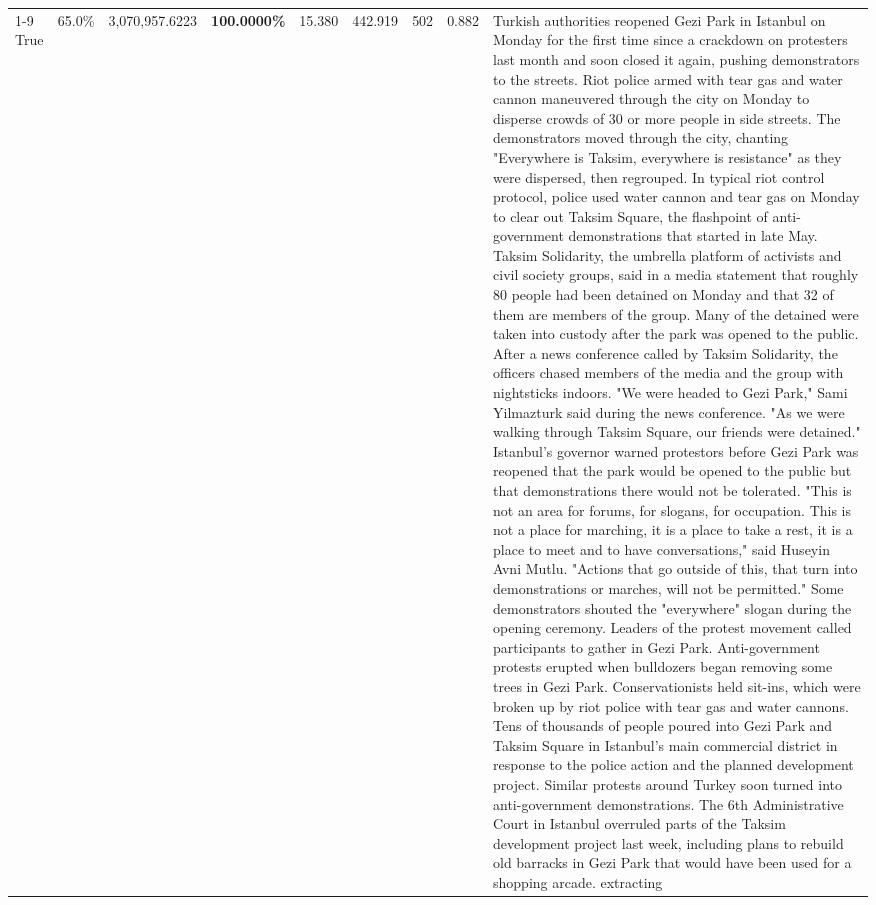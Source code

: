 \begin{table}[H]
\begin{tabular}{lllrlllll}
\cline{1-9}
True & 65.0\% & 3,070,957.6223 & \bfseries \color{red} 100.0000\% & 15.380 & 442.919 & 502 & 0.882 & Turkish authorities reopened Gezi Park in Istanbul on Monday for the first time since a crackdown on protesters last month and soon closed it again, pushing demonstrators to the streets. Riot police armed with tear gas and water cannon maneuvered through the city on Monday to disperse crowds of 30 or more people in side streets. The demonstrators moved through the city, chanting "Everywhere is Taksim, everywhere is resistance" as they were dispersed, then regrouped. In typical riot control protocol, police used water cannon and tear gas on Monday to clear out Taksim Square, the flashpoint of anti-government demonstrations that started in late May. Taksim Solidarity, the umbrella platform of activists and civil society groups, said in a media statement that roughly 80 people had been detained on Monday and that 32 of them are members of the group. Many of the detained were taken into custody after the park was opened to the public. After a news conference called by Taksim Solidarity, the officers chased members of the media and the group with nightsticks indoors. "We were headed to Gezi Park," Sami Yilmazturk said during the news conference. "As we were walking through Taksim Square, our friends were detained." Istanbul's governor warned protestors before Gezi Park was reopened that the park would be opened to the public but that demonstrations there would not be tolerated. "This is not an area for forums, for slogans, for occupation. This is not a place for marching, it is a place to take a rest, it is a place to meet and to have conversations," said Huseyin Avni Mutlu. "Actions that go outside of this, that turn into demonstrations or marches, will not be permitted." Some demonstrators shouted the "everywhere" slogan during the opening ceremony. Leaders of the protest movement called participants to gather in Gezi Park. Anti-government protests erupted when bulldozers began removing some trees in Gezi Park. Conservationists held sit-ins, which were broken up by riot police with tear gas and water cannons. Tens of thousands of people poured into Gezi Park and Taksim Square in Istanbul's main commercial district in response to the police action and the planned development project. Similar protests around Turkey soon turned into anti-government demonstrations. The 6th Administrative Court in Istanbul overruled parts of the Taksim development project last week, including plans to rebuild old barracks in Gezi Park that would have been used for a shopping arcade. extracting \\

\end{tabular}
\end{table}
